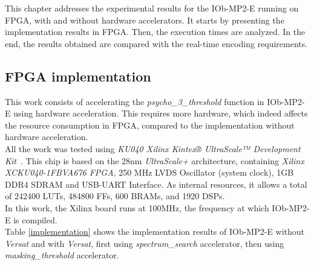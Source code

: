 


This chapter addresses the experimental results for the IOb-MP2-E running on FPGA, with and without hardware accelerators.
It starts by presenting the implementation results in FPGA. Then, the execution times are analyzed. In the end, the results obtained are compared with the real-time encoding requirements.

\subsection{FPGA implementation}
This work consists of accelerating the \textit{psycho\_3\_threshold} function in IOb-MP2-E using hardware acceleration. This requires more hardware, which indeed affects the resource consumption in FPGA, compared to the implementation without hardware acceleration. \\
All the work was tested using \textit{KU040 Xilinx Kintex® UltraScale™ Development Kit}~\cite{bib:xcku040}. This chip is based on the 28nm \textit{UltraScale+} architecture, containing \textit{Xilinx XCKU040-1FBVA676 FPGA}, 250 MHz LVDS Oscillator (system clock), 1GB DDR4 SDRAM and USB-UART Interface. As internal resources, it allows a total of 242400 LUTs, 484800 FFs, 600 BRAMs, and 1920 DSPs. \\
In this work, the Xilinx board runs at 100MHz, the frequency at which IOb-MP2-E is compiled.\\ 

Table \ref{implementation} shows the implementation results of IOb-MP2-E without \textit{Versat} and with \textit{Versat}, first using \textit{spectrum\_search} accelerator, then using \textit{masking\_threshold} accelerator.

\vspace{0.5cm}

